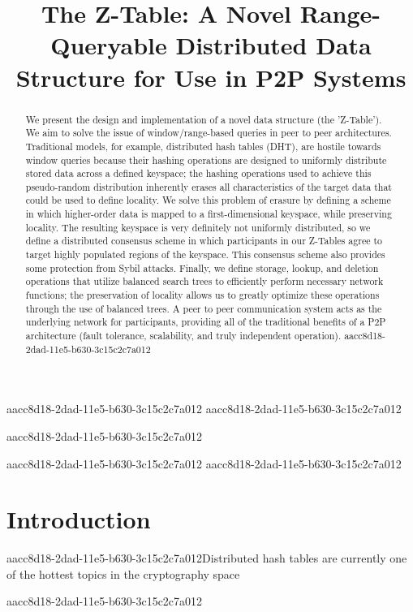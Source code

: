 \documentclass[12pt]{article}
\title{The Z-Table: A Novel Range-Queryable Distributed Data Structure for Use in P2P Systems}
\begin{document}
aacc8d18-2dad-11e5-b630-3c15c2c7a012
aacc8d18-2dad-11e5-b630-3c15c2c7a012\maketitle

aacc8d18-2dad-11e5-b630-3c15c2c7a012\begin{abstract}
We present the design and implementation of a novel data structure (the 'Z-Table'). We aim to solve the issue of window/range-based queries in peer to peer architectures. Traditional models, for example,  distributed hash tables (DHT), are hostile towards window queries because their hashing operations are designed to uniformly distribute stored data across a defined keyspace; the hashing operations used to achieve this pseudo-random distribution inherently erases all characteristics of the target data that could be used to define locality. We solve this problem of erasure by defining a scheme in which higher-order data is mapped to a first-dimensional keyspace, while preserving locality. The resulting keyspace is very definitely not uniformly distributed, so we define a distributed consensus scheme in which participants in our Z-Tables agree to target highly populated regions of the keyspace. This consensus scheme also provides some protection from Sybil attacks. Finally, we define storage, lookup, and deletion operations that utilize balanced search trees to efficiently perform necessary network functions; the preservation of locality allows us to greatly optimize these operations through the use of balanced trees. A peer to peer communication system acts as the underlying network for participants, providing all of the traditional benefits of a P2P architecture (fault tolerance, scalability, and truly independent operation).
aacc8d18-2dad-11e5-b630-3c15c2c7a012\end{abstract}


aacc8d18-2dad-11e5-b630-3c15c2c7a012\newpage
aacc8d18-2dad-11e5-b630-3c15c2c7a012\section{Introduction}
aacc8d18-2dad-11e5-b630-3c15c2c7a012Distributed hash tables are currently one of the hottest topics in the cryptography space~\cite{Stoica:2001dj,Rowstron:2001ea,Ratnasamy:2001wn}

\printbibliography
aacc8d18-2dad-11e5-b630-3c15c2c7a012
\end{document}
